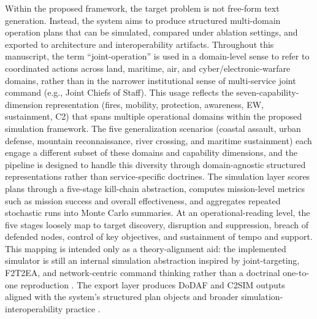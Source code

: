 Within the proposed framework, the target problem is not free-form text generation. Instead, the system aims to produce structured multi-domain operation plans that can be simulated, compared under ablation settings, and exported to architecture and interoperability artifacts. Throughout this manuscript, the term ``joint-operation'' is used in a domain-level sense to refer to coordinated actions across land, maritime, air, and cyber/electronic-warfare domains, rather than in the narrower institutional sense of multi-service joint command (e.g., Joint Chiefs of Staff). This usage reflects the seven-capability-dimension representation (fires, mobility, protection, awareness, EW, sustainment, C2) that spans multiple operational domains within the proposed simulation framework. The five generalization scenarios (coastal assault, urban defense, mountain reconnaissance, river crossing, and maritime sustainment) each engage a different subset of these domains and capability dimensions, and the pipeline is designed to handle this diversity through domain-agnostic structured representations rather than service-specific doctrines. The simulation layer scores plans through a five-stage kill-chain abstraction, computes mission-level metrics such as mission success and overall effectiveness, and aggregates repeated stochastic runs into Monte Carlo summaries. At an operational-reading level, the five stages loosely map to target discovery, disruption and suppression, breach of defended nodes, control of key objectives, and sustainment of tempo and support. This mapping is intended only as a theory-alignment aid: the implemented simulator is still an internal simulation abstraction inspired by joint-targeting, F2T2EA, and network-centric command thinking rather than a doctrinal one-to-one reproduction \citep{jointchiefs2013jointtargeting,tirpak2000f2t2ea,alberts1999networkcentric,law2015simulation}. The export layer produces DoDAF and C2SIM outputs aligned with the system's structured plan objects and broader simulation-interoperability practice \citep{dodaf2010,ieee2010hla,siso2020c2sim,blais2021automated}.

